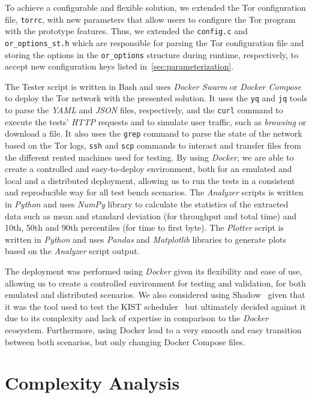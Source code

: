 To achieve a configurable and flexible solution, we extended the Tor configuration file, \texttt{torrc}, with new parameters that allow users to configure the Tor program with the prototype features. Thus, we extended the 
\texttt{config.c} and \texttt{or\_options\_st.h} which are responsible for parsing the Tor configuration file and storing the options in the \texttt{or\_options} structure during runtime, respectively, to accept new configuration keys listed in~\cref{sec:parameterization}.

The Tester script is written in Bash and uses \textit{Docker Swarm} or \textit{Docker Compose} to deploy the Tor network with the presented solution. It uses the \texttt{yq} and \texttt{jq} tools to parse the \textit{YAML} and \textit{JSON} files, respectively, and the \texttt{curl} command to execute the tests' \textit{HTTP} requests and to simulate user traffic, such as \textit{browsing} or download a file. It also uses the \texttt{grep} command to parse the state of the network based on the Tor logs, \texttt{ssh} and \texttt{scp} commands to interact and transfer files from the different rented machines used for testing. By using \textit{Docker}, we are able to create a controlled and easy-to-deploy environment, both for an emulated and local and a distributed deployment, allowing us to run the tests in a consistent and reproducible way for all test bench scenarios. 
The \textit{Analyzer} scripts is written in \textit{Python} and uses \textit{NumPy} library to calculate the statistics of the extracted data such as mean and standard deviation (for throughput and total time) and 10th, 50th and 90th percentiles (for time to first byte).   
The \textit{Plotter} script is written in \textit{Python} and uses \textit{Pandas} and \textit{Matplotlib} libraries to generate plots based on the \textit{Analyzer} script output.

The deployment was performed using \textit{Docker} given its flexibility and ease of use, allowing us to create a controlled environment for testing and validation, for both emulated and distributed scenarios. We also considered using Shadow~\cite{shadow-ndss2012} given that it was the tool used to test the KIST scheduler~\cite{KIST} but ultimately decided against it due to its complexity and lack of expertise in comparison to the \textit{Docker} ecosystem. Furthermore, using Docker lead to a very smooth and easy transition between both scenarios, but only changing Docker Compose files. 


\section{Complexity Analysis}\label{sec:complexity_analysis}

